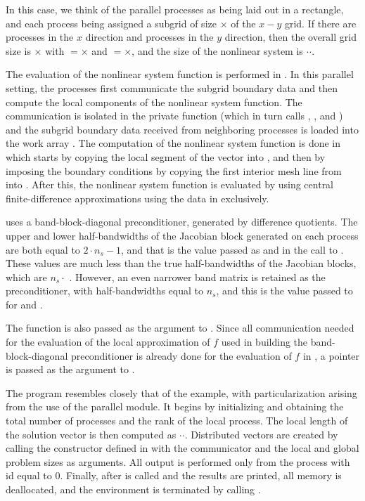 In this case, we think of the parallel {\mpi} processes as
being laid out in a rectangle, and each process being assigned a
subgrid of size $\times$ of the $x-y$ grid. If
there are  processes in the $x$ direction and 
processes in the $y$ direction, then the overall grid size is
$\times$ with $=$$\times$ and
$=$$\times$, and the size of the nonlinear system is
$\cdot$$\cdot$.  

The evaluation of the nonlinear system function is performed in .
In this parallel setting, the processes first communicate the subgrid
boundary data and then compute the local components of the nonlinear system
function. The {\mpi} communication is isolated in the private function 
(which in turn calls , , and ) and the 
subgrid boundary data received from neighboring processes is loaded into the
work array . The computation of the nonlinear system function is done
in  which starts by copying the local segment of the 
vector into , and then by imposing the boundary conditions by copying the
first interior mesh line from  into . After this, the nonlinear
system function is evaluated by using central finite-difference approximations
using the data in  exclusively.

{\kinbbdpre} uses a band-block-diagonal preconditioner, generated by difference
quotients.  The upper and lower half-bandwidths of the Jacobian block generated
on each process are both equal to $2 \cdot n_s - 1$, and that is the value
passed as  and  in the call to .
These values are much less than the true half-bandwidths of the Jacobian blocks,
which are $n_s \cdot$ .  However, an even narrower band matrix
is retained as the preconditioner, with half-bandwidths equal to $n_s$, and this
is the value passed to  for  and .

The function  is also passed as the  argument to 
. Since all communication needed for the evaluation of the
local approximation of $f$ used in building the band-block-diagonal preconditioner
is already done for the evaluation of $f$ in , a  pointer is
passed as the  argument to .

The  program resembles closely that of the  example, with
particularization arising from the use of the parallel {\mpi} {\nvecp} module.
It begins by initializing {\mpi} and obtaining the total number of processes and 
the rank of the local process. The local length of the solution vector is then 
computed as $\cdot$$\cdot$.
Distributed vectors are created by calling the constructor defined in {\nvecp}
with the {\mpi} communicator and the local and global problem sizes as arguments.
All output is performed only from the process with id equal to $0$.
Finally, after  is called and the results are printed, all memory
is deallocated, and the {\mpi} environment is terminated by calling .

